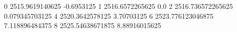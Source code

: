 0 2515.9619140625 -0.6953125
1 2516.6572265625 0.0
2 2516.736572265625 0.079345703125
4 2520.3642578125 3.70703125
6 2523.776123046875 7.118896484375
8 2525.54638671875 8.88916015625
